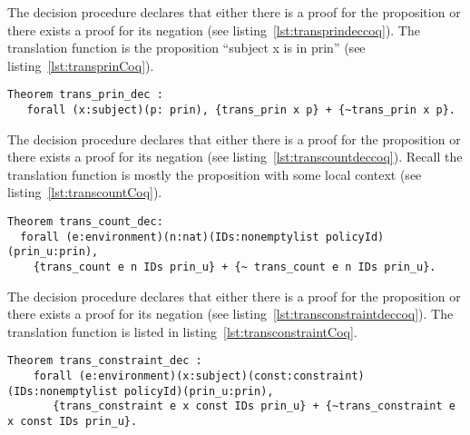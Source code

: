 The decision procedure  declares that either there is a proof for the proposition  or there exists a proof for its negation (see listing~\ref{lst:transprindeccoq}). The translation function  is the proposition ``subject x is in prin'' (see listing~\ref{lst:transprinCoq}).

\begin{minipage}[c]{0.95\textwidth}
\begin{lstlisting}
Theorem trans_prin_dec :
   forall (x:subject)(p: prin), {trans_prin x p} + {~trans_prin x p}.
\end{lstlisting}
\end{minipage}

The decision procedure  declares that either there is a proof for the proposition  or there exists a proof for its negation (see listing~\ref{lst:transcountdeccoq}). Recall the translation function  is mostly the proposition  with some local context (see listing~\ref{lst:transcountCoq}).

\begin{lstlisting}
Theorem trans_count_dec: 
  forall (e:environment)(n:nat)(IDs:nonemptylist policyId)(prin_u:prin), 
    {trans_count e n IDs prin_u} + {~ trans_count e n IDs prin_u}.
\end{lstlisting}

The decision procedure  declares that either there is a proof for the proposition  or there exists a proof for its negation (see listing~\ref{lst:transconstraintdeccoq}). The translation function  is listed in listing~\ref{lst:transconstraintCoq}. 


\begin{minipage}[c]{0.95\textwidth}
\begin{lstlisting}
Theorem trans_constraint_dec :
    forall (e:environment)(x:subject)(const:constraint)(IDs:nonemptylist policyId)(prin_u:prin),
       {trans_constraint e x const IDs prin_u} + {~trans_constraint e x const IDs prin_u}.
\end{lstlisting}
\end{minipage}

